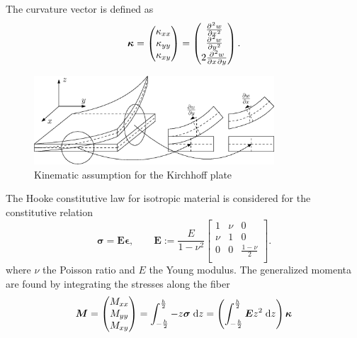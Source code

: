 \documentclass[preprint,12pt]{elsarticle}
\begin{document}
The curvature vector is defined as	
\begin{equation}
	\bm{\kappa} = 
\begin{pmatrix}
\kappa_{xx} \\
\kappa_{yy} \\
\kappa_{xy} \\
\end{pmatrix} = 
\begin{pmatrix}
\diffp[2]{w}{x} \\
\diffp[2]{w}{y} \\
2 \diffp{w}{x,y} \\
\end{pmatrix}.
\end{equation}

	\begin{figure}[tb]
		\centering
		\includegraphics[width=0.8\textwidth]{Kirchh_sketch.eps}
		\caption{Kinematic assumption for the Kirchhoff plate}
		\label{fig:Kirchh_sketch}
	\end{figure}
	
	The Hooke constitutive law for isotropic material is considered for the constitutive relation
	\begin{equation}
	\bm{\sigma} = 
	\bm{E} \bm{\epsilon} , \qquad \bm{E} :=
	\frac{E}{1 - \nu^2}
	\begin{bmatrix}
	1 & \nu & 0 \\
	\nu & 1 & 0 \\
	0  &  0 & \frac{1-\nu}{2}\\
	\end{bmatrix}.
	\end{equation}
	where $\nu$ the Poisson ratio and $E$ the Young modulus.
	The generalized momenta are found by integrating the stresses along the fiber
	\begin{equation*}
	\bm{M} =
	\begin{pmatrix}
	M_{xx} \\
	M_{yy} \\
	M_{xy} \\
	\end{pmatrix} = \int_{-\frac{h}{2} }^{\frac{h}{2}}
	-z \bm{\sigma} \d{z}=
	\left( \int_{-\frac{h}{2} }^{\frac{h}{2}}
	\bm{E} z^2 \d{z} \right) \bm{\kappa}
	\end{equation*}
	
\end{document}

